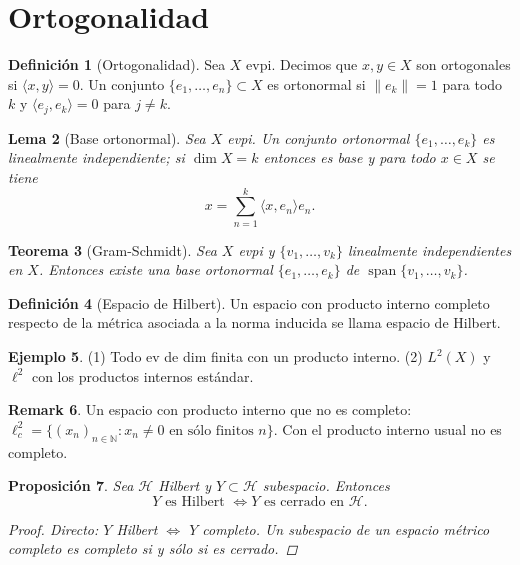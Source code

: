 \documentclass[11pt]{article}
\theoremstyle{definition}
\newtheorem{definition}{Definición}[section]
\newtheorem{example}[definition]{Ejemplo}
\newtheorem{remark}[definition]{Remark}
\theoremstyle{plain}
\newtheorem{lemma}[definition]{Lema}
\newtheorem{proposition}[definition]{Proposición}
\newtheorem{theorem}[definition]{Teorema}
\begin{document}
\section*{Ortogonalidad}

\begin{definition}[Ortogonalidad]
Sea $X$ evpi. Decimos que $x,y\in X$ son ortogonales si $\langle x,y\rangle=0$. Un conjunto $\{e_1,\dots,e_n\}\subset X$ es ortonormal si $\|e_k\|=1$ para todo $k$ y $\langle e_j,e_k\rangle=0$ para $j\neq k$.
\end{definition}

\begin{lemma}[Base ortonormal]
Sea $X$ evpi. Un conjunto ortonormal $\{e_1,\dots,e_k\}$ es linealmente independiente; si $\dim X=k$ entonces es base y para todo $x\in X$ se tiene
$$x=\sum_{n=1}^k\langle x,e_n\rangle e_n.$$ 
\end{lemma}

\begin{theorem}[Gram-Schmidt]
Sea $X$ evpi y $\{v_1,\dots,v_k\}$ linealmente independientes en $X$. Entonces existe una base ortonormal $\{e_1,\dots,e_k\}$ de $\operatorname{span}\{v_1,\dots,v_k\}$.
\end{theorem}

\begin{definition}[Espacio de Hilbert]
Un espacio con producto interno completo respecto de la métrica asociada a la norma inducida se llama espacio de Hilbert.
\end{definition}

\begin{example}
(1) Todo ev de dim finita con un producto interno.
(2) $L^2(X)$ y $\ell^2$ con los productos internos estándar.
\end{example}

\begin{remark}
Un espacio con producto interno que no es completo: $\ell^2_c=\{(x_n)_{n\in\mathbb{N}}:x_n\neq0\text{ en sólo finitos }n\}$. Con el producto interno usual no es completo.
\end{remark}

\begin{proposition}
Sea $\mathcal{H}$ Hilbert y $Y\subset\mathcal{H}$ subespacio. Entonces
$$Y\text{ es Hilbert }\iff Y\text{ es cerrado en }\mathcal{H}.$$
\begin{proof}
Directo: $Y$ Hilbert $\iff$ $Y$ completo. Un subespacio de un espacio métrico completo es completo si y sólo si es cerrado.
\end{proof}
\end{proposition}
\end{document}

